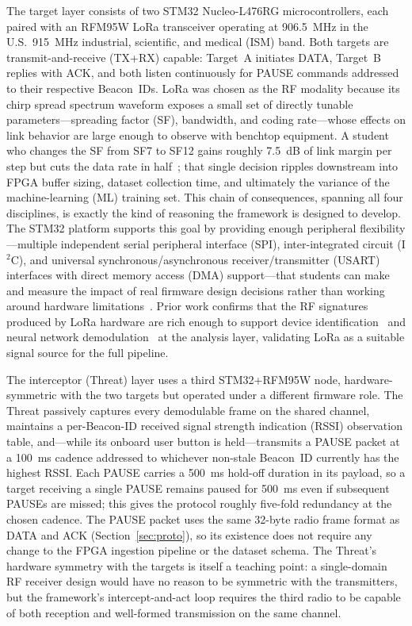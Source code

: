 \documentclass[conference]{IEEEtran}
\begin{document}
{ The target layer consists of two STM32 Nucleo-L476RG microcontrollers, each paired with an RFM95W LoRa transceiver operating at 906.5~MHz in the U.S.\ 915~MHz industrial, scientific, and medical (ISM) band. Both targets are transmit-and-receive (TX+RX) capable: Target~A initiates DATA, Target~B replies with ACK, and both listen continuously for PAUSE commands addressed to their respective Beacon~IDs. LoRa was chosen as the RF modality because its chirp spread spectrum waveform exposes a small set of directly tunable parameters---spreading factor (SF), bandwidth, and coding rate---whose effects on link behavior are large enough to observe with benchtop equipment. A student who changes the SF from SF7 to SF12 gains roughly 7.5~dB of link margin per step but cuts the data rate in half~\cite{b12}; that single decision ripples downstream into FPGA buffer sizing, dataset collection time, and ultimately the variance of the machine-learning (ML) training set. This chain of consequences, spanning all four disciplines, is exactly the kind of reasoning the framework is designed to develop. The STM32 platform supports this goal by providing enough peripheral flexibility---multiple independent serial peripheral interface (SPI), inter-integrated circuit (I$^2$C), and universal synchronous/asynchronous receiver/transmitter (USART) interfaces with direct memory access (DMA) support---that students can make and measure the impact of real firmware design decisions rather than working around hardware limitations~\cite{b10,b13}. Prior work confirms that the RF signatures produced by LoRa hardware are rich enough to support device identification~\cite{b6} and neural network demodulation~\cite{b8} at the analysis layer, validating LoRa as a suitable signal source for the full pipeline.}

The interceptor (Threat) layer uses a third STM32+RFM95W node, hardware-symmetric with the two targets but operated under a different firmware role. The Threat passively captures every demodulable frame on the shared channel, maintains a per-Beacon-ID received signal strength indication (RSSI) observation table, and---while its onboard user button is held---transmits a PAUSE packet at a 100~ms cadence addressed to whichever non-stale Beacon~ID currently has the highest RSSI. Each PAUSE carries a 500~ms hold-off duration in its payload, so a target receiving a single PAUSE remains paused for 500~ms even if subsequent PAUSEs are missed; this gives the protocol roughly five-fold redundancy at the chosen cadence. The PAUSE packet uses the same 32-byte radio frame format as DATA and ACK (Section~\ref{sec:proto}), so its existence does not require any change to the FPGA ingestion pipeline or the dataset schema. The Threat's hardware symmetry with the targets is itself a teaching point: a single-domain RF receiver design would have no reason to be symmetric with the transmitters, but the framework's intercept-and-act loop requires the third radio to be capable of both reception and well-formed transmission on the same channel.
\end{document}
